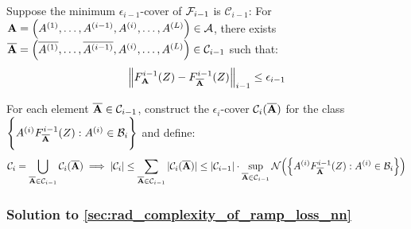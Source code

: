 \begin{proof*}
    \noindent Suppose the minimum $\epsilon_{i-1}$-cover of $\mathcal{F}_{i-1}$ is $\mathcal{C}_{i-1}$: For ${\bf A}=\Big( A^{(1)}, \dots, A^{(i-1)}, A^{(i)}, \dots, A^{(L)} \Big) \in \mathcal{A}$, there exists $\overline{{\bf A}} = \Big( \overline{A^{(1)}}, \dots, \overline{A^{(i-1)}}, A^{(i)}, \dots, A^{(L)} \Big) \in \mathcal{C}_{i-1}$ such that:
    \begin{align*}
        \Big\| F^{i-1}_{\bf A}(Z) - F^{i-1}_{\overline{{\bf A}}}(Z)\Big\|_{i-1} \le \epsilon_{i-1}
    \end{align*}

    \noindent For each element ${\bf \overline{A}}\in\mathcal{C}_{i-1}$, construct the $\epsilon_i$-cover $\mathcal{C}_i({\bf \overline{A}})$ for the class $\Bigg\{ A^{(i)}F^{i-1}_{\bf \overline{A}}(Z):A^{(i)}\in\mathcal{B}_i \Bigg\}$ and define:
    \begin{align*}
        \mathcal{C}_i = \bigcup_{{\bf \overline{A}}\in\mathcal{C}_{i-1}}\mathcal{C}_i ({\bf \overline{A}})\implies |\mathcal{C}_i| \le \sum_{{\bf \overline{A}}\in\mathcal{C}_{i-1}}|\mathcal{C}_i({\bf \overline{A}})| \le |\mathcal{C}_{i-1}|\cdot\sup_{{\bf \overline{A}}\in\mathcal{C}_{i-1}} \mathcal{N}\Big( 
            \Big\{ 
                A^{(i)}F^{i-1}_{\bf \overline{A}}(Z):A^{(i)}\in\mathcal{B}_i
             \Big\}
         \Big)
    \end{align*}
\end{proof*}


\subsubsection{Solution to \ref{sec:rad_complexity_of_ramp_loss_nn}}

